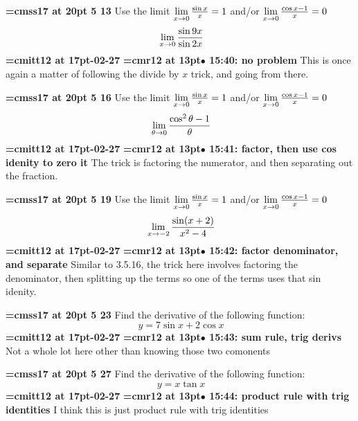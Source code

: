 {\medskip\noindent\bf\font\titlefont=cmss17 at 20pt 5 13}\medskip
Use the limit
$\lim\limits_{x \to 0} {\sin x \over x} = 1$
and/or
$\lim\limits_{x \to 0} {\cos x - 1 \over x} = 0$
$$\
\lim_{x \to 0} {\sin 9x \over \sin 2x}
$$
{\medskip\noindent\bf\font\titlefont=cmitt12 at 17pt-02-27}\medskip
{\smallskip\noindent\bf\font\titlefont=cmr12 at 13pt\titlefont $\bullet$ 15:40: no problem}\smallskip
This is once again a matter of following the divide by $x$ trick, and going from there.
\par

{\medskip\noindent\bf\font\titlefont=cmss17 at 20pt 5 16}\medskip
Use the limit
$\lim\limits_{x \to 0} {\sin x \over x} = 1$
and/or
$\lim\limits_{x \to 0} {\cos x - 1 \over x} = 0$
$$\
\lim_{\theta \to 0}{\cos^2\theta - 1 \over \theta}
$$
{\medskip\noindent\bf\font\titlefont=cmitt12 at 17pt-02-27}\medskip
{\smallskip\noindent\bf\font\titlefont=cmr12 at 13pt\titlefont $\bullet$ 15:41: factor, then use cos idenity to zero it}\smallskip
The trick is factoring the numerator, and then separating out the fraction.
\par

{\medskip\noindent\bf\font\titlefont=cmss17 at 20pt 5 19}\medskip
Use the limit
$\lim\limits_{x \to 0} {\sin x \over x} = 1$
and/or
$\lim\limits_{x \to 0} {\cos x - 1 \over x} = 0$
$$\
\lim_{x \to -2}{
\sin(x + 2)
\over
x^2 - 4
}
$$
{\medskip\noindent\bf\font\titlefont=cmitt12 at 17pt-02-27}\medskip
{\smallskip\noindent\bf\font\titlefont=cmr12 at 13pt\titlefont $\bullet$ 15:42: factor denominator, and separate}\smallskip
Similar to 3.5.16, the trick here involves factoring the denominator, then splitting up the terms so one of the terms uses that sin idenity.
\par

\xrdef{node77}
{\medskip\noindent\bf\font\titlefont=cmss17 at 20pt 5 23}\medskip
Find the derivative of the following function:
$$\
y = 7\sin x + 2\cos x
$$
{\medskip\noindent\bf\font\titlefont=cmitt12 at 17pt-02-27}\medskip
{\smallskip\noindent\bf\font\titlefont=cmr12 at 13pt\titlefont $\bullet$ 15:43: sum rule, trig derivs}\smallskip
Not a whole lot here other than knowing those two comonents
\par

\xrdef{node78}
{\medskip\noindent\bf\font\titlefont=cmss17 at 20pt 5 27}\medskip
Find the derivative of the following function:
$$\
y = x \tan x
$$
{\medskip\noindent\bf\font\titlefont=cmitt12 at 17pt\titlefont 2026-02-27}\medskip
{\smallskip\noindent\bf\font\titlefont=cmr12 at 13pt\titlefont $\bullet$ 15:44: product rule with trig identities}\smallskip
I think this is just product rule with trig identities
\par

